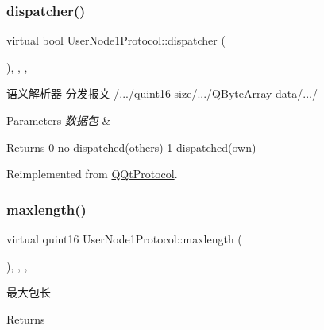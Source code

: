 \subsubsection{\texorpdfstring{dispatcher()}{dispatcher()}}
{\footnotesize\ttfamily virtual bool User\+Node1\+Protocol\+::dispatcher (\begin{DoxyParamCaption}\item[{const Q\+Byte\+Array \&}]{ }\end{DoxyParamCaption})\hspace{0.3cm}{\ttfamily [inline]}, {\ttfamily [override]}, {\ttfamily [protected]}, {\ttfamily [virtual]}}



语义解析器 分发报文 /.../quint16 size/.../\+Q\+Byte\+Array data/.../ 


\begin{DoxyParams}{Parameters}
{\em 数据包} & \\
\hline
\end{DoxyParams}
\begin{DoxyReturn}{Returns}
0 no dispatched(others) 1 dispatched(own) 
\end{DoxyReturn}


Reimplemented from \mbox{\hyperlink{class_q_qt_protocol_a35a69c4b89c8cf7459038f40d75e0dc9}{Q\+Qt\+Protocol}}.

\mbox{\label{class_user_node1_protocol_aa84ed8cf50ee57a76a91c6472c669d89}} 
\subsubsection{\texorpdfstring{maxlength()}{maxlength()}}
{\footnotesize\ttfamily virtual quint16 User\+Node1\+Protocol\+::maxlength (\begin{DoxyParamCaption}{ }\end{DoxyParamCaption})\hspace{0.3cm}{\ttfamily [inline]}, {\ttfamily [override]}, {\ttfamily [protected]}, {\ttfamily [virtual]}}



最大包长 

\begin{DoxyReturn}{Returns}

\end{DoxyReturn}


